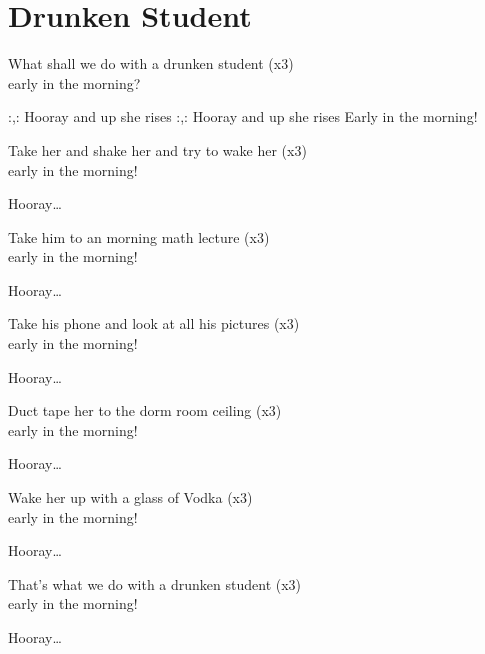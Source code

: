 \section{Drunken Student}
What shall we do with a drunken student (x3)\\
early in the morning?

:,: Hooray and up she rises :,:
Hooray and up she rises
Early in the morning!

Take her and shake her and try to wake her (x3)\\
early in the morning!

Hooray…

Take him to an morning math lecture (x3)\\
early in the morning!

Hooray…

Take his phone and look at all his pictures (x3)\\
early in the morning!

Hooray…

Duct tape her to the dorm room ceiling (x3)\\
early in the morning!

Hooray…

Wake her up with a glass of Vodka (x3)\\
early in the morning!

Hooray…

That’s what we do with a drunken student (x3)\\
early in the morning!

Hooray…
